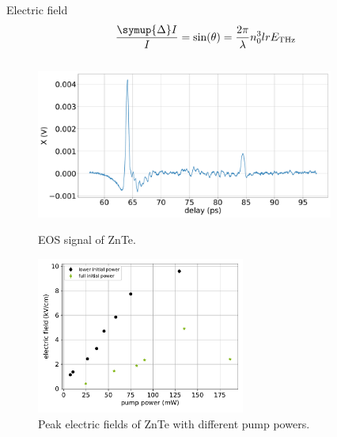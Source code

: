 \documentclass[aspectratio=1610, 9pt]{beamer}
\begin{document}
\begin{frame}{Electric field}
  \begin{equation}
    \frac{\symup{\Delta}I}{I} = \text{sin}(\theta) = \frac{2\pi}{\lambda} n_0^3 l r E_\text{THz}
  \end{equation}
  \begin{center}
  \begin{columns}
    \begin{column}{.5\textwidth}
      \begin{figure}
        \begin{overprint}
          \includegraphics[width=\textwidth]{images/2_11_30_20normalX.pdf}\caption{EOS signal of ZnTe.}
          \includegraphics[width=0.7\textwidth]{images/eltric_field_ZnTe.pdf}\caption{Peak electric fields of ZnTe with different pump powers.}
        \end{overprint}
      \end{figure}
  \end{column}
  \begin{column}{.5\textwidth}
    \begin{figure}
      \begin{overprint}

\end{overprint}
\end{figure}
\end{column}
\end{columns}
\end{center}
\end{frame}
\end{document}
